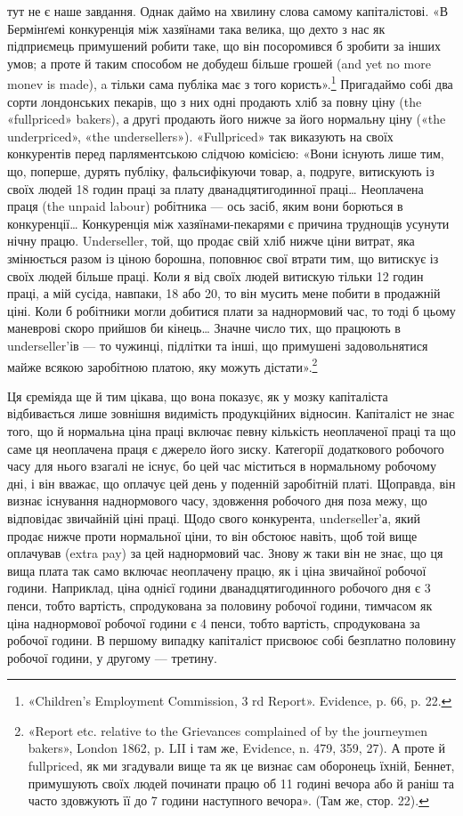 тут не є наше завдання. Однак даймо на хвилину слова
самому капіталістові. «В Бермінґемі конкуренція між хазяїнами
така велика, що дехто з нас як підприємець примушений робити
таке, що він посоромився б зробити за інших умов; а проте й
таким способом не добудеш більше грошей (and yet no more
monev is made), a тільки сама публіка має з того користь».\footnote{
«Children’s Employment Commission, 3 rd Report». Evidence, p. 66, p. 22.
}
Пригадаймо собі два сорти лондонських пекарів, що з них одні
продають хліб за повну ціну (the «fullpriced» bakers), а другі
продають його нижче за його нормальну ціну («the underpriced»,
«the undersellers»). «Fullpriced» так виказують на своїх
конкурентів перед парляментською слідчою комісією: «Вони
існують лише тим, що, поперше, дурять публіку, фальсифікуючи
товар, а, подруге, витискують із своїх людей 18 годин праці
за плату дванадцятигодинної праці\dots{} Неоплачена праця (the
unpaid labour) робітника — ось засіб, яким вони борються в
конкуренції\dots{} Конкуренція між хазяїнами-пекарями є причина
труднощів усунути нічну працю. Underseller, той, що продає
свій хліб нижче ціни витрат, яка змінюється разом із ціною
борошна, поповнює свої втрати тим, що витискує із своїх людей
більше праці. Коли я від своїх людей витискую тільки 12 годин
праці, а мій сусіда, навпаки, 18 або 20, то він мусить мене побити
в продажній ціні. Коли б робітники могли добитися плати за
наднормовий час, то тоді б цьому маневрові скоро прийшов би
кінець\dots{} Значне число тих, що працюють в underseller’ів — то
чужинці, підлітки та інші, що примушені задовольнятися майже
всякою заробітною платою, яку можуть дістати».\footnote{
«Report etc. relative to the Grievances complained of by the
journeymen bakers», London 1862, p. LII і там же, Evidence, n. 479,
359, 27). А проте й fullpriced, як ми згадували вище та як це визнає сам
оборонець їхній, Беннет, примушують своїх людей починати працю об
11 годині вечора або й раніш та часто здовжують її до 7 години наступного
вечора». (Там же, стор. 22).
}

Ця єреміяда ще й тим цікава, що вона показує, як у мозку
капіталіста відбивається лише зовнішня видимість продукційних
відносин. Капіталіст не знає того, що й нормальна ціна праці
включає певну кількість неоплаченої праці та що саме ця неоплачена
праця є джерело його зиску. Категорії додаткового робочого
часу для нього взагалі не існує, бо цей час міститься в нормальному
робочому дні, і він вважає, що оплачує цей день у поденній
заробітній платі. Щоправда, він визнає існування наднормового
часу, здовження робочого дня поза межу, що відповідає звичайній
ціні праці. Щодо свого конкурента, underseller’а, який продає
нижче проти нормальної ціни, то він обстоює навіть, щоб той
вище оплачував (extra pay) за цей наднормовий час. Знову ж
таки він не знає, що ця вища плата так само включає неоплачену
працю, як і ціна звичайної робочої години. Наприклад,
ціна однієї години дванадцятигодинного робочого дня є 3 пенси,
тобто вартість, спродукована за половину робочої години, тимчасом
як ціна наднормової робочої години є 4 пенси, тобто вартість,
спродукована за  робочої години. В першому випадку капіталіст
присвоює собі безплатно половину робочої години, у
другому — третину.


